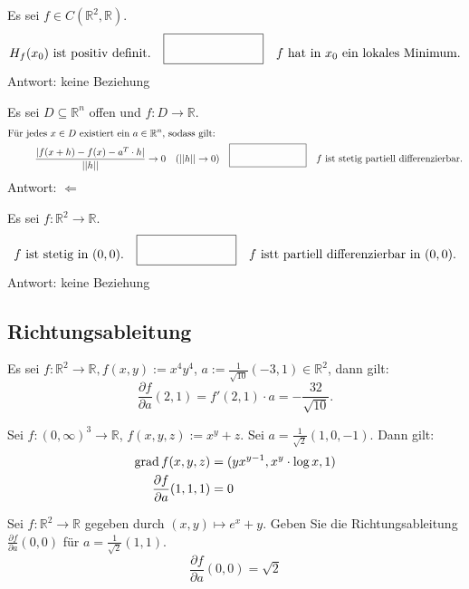 Es sei $f \in C(\mathbb{R}^2, \mathbb{R})$.
\begin{displaymath}
  H_f(x_0) \text{ ist positiv definit.} \quad \fbox{\rule{1in}{0pt}\rule[-0.5ex]{0pt}{4ex}} \quad f \text{ hat in } x_0 \text{ ein lokales Minimum.}
\end{displaymath}
Antwort: keine Beziehung

Es sei $D \subseteq \mathbb{R}^n$ offen und $f : D \to \mathbb{R}$.
\begin{align*}
  \text{Für jedes } x \in D \text{ existiert ein } a \in \mathbb{R}^n \text{, sodass gilt: }&\\
  \frac{|f(x + h) - f(x) - a^T \cdot h|}{||h||} \to 0 \quad (||h|| \to 0)& \quad \fbox{\rule{1in}{0pt}\rule[-0.5ex]{0pt}{4ex}} \quad f \text{ ist stetig partiell differenzierbar.}
\end{align*}
Antwort: $\Leftarrow$

Es sei $f : \mathbb{R}^2 \to \mathbb{R}$.
\begin{displaymath}
  f \text{ ist stetig in } (0,0).
  \quad \fbox{\rule{1in}{0pt}\rule[-0.5ex]{0pt}{4ex}} \quad
  f \text{ istt partiell differenzierbar in } (0,0).
\end{displaymath}
Antwort: keine Beziehung

\subsection{Richtungsableitung}
Es sei $f : \mathbb{R}^2 \to \mathbb{R}, f(x,y) := x^4 y^4$, $a := \frac{1}{\sqrt{10}}(-3,1) \in \mathbb{R}^2$, dann gilt:
\begin{displaymath}
  \frac{\partial f}{\partial a} \left(2,1\right) = f'(2,1) \cdot a = -\frac{32}{\sqrt{10}}.
\end{displaymath}

Sei $f : (0,\infty)^3 \to \mathbb{R}$, $f(x,y,z) := x^y + z$.
Sei $a = \frac{1}{\sqrt{2}}(1, 0, -1)$.
Dann gilt:
\begin{align*}
  \operatorname{grad} f(x,y,z) &= (yx^{y - 1}, x^y \cdot \log x, 1)\\
  \frac{\partial f}{\partial a} (1,1,1) &= 0
\end{align*}

Sei $f : \mathbb{R}^2 \to \mathbb{R}$ gegeben durch $(x,y) \mapsto e^x + y$.
Geben Sie die Richtungsableitung $\frac{\partial f}{\partial a}(0,0)$ für $a = \frac{1}{\sqrt{2}} (1,1)$.
\begin{displaymath}
  \frac{\partial f}{\partial a} (0,0) = \sqrt{2}
\end{displaymath}

